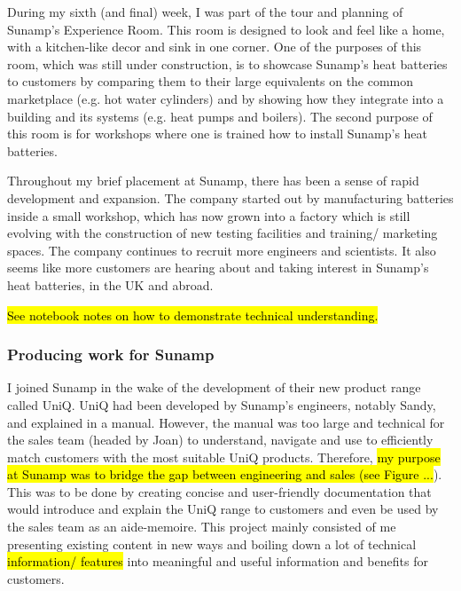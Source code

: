 During my sixth (and final) week, I was part of the tour and planning of Sunamp's Experience Room.
This room is designed to look and feel like a home, with a kitchen-like decor and sink in one corner.
One of the purposes of this room, which was still under construction, is to showcase Sunamp's heat batteries to customers by comparing them to their large equivalents on the common marketplace (e.g. hot water cylinders) and by showing how they integrate into a building and its systems (e.g. heat pumps
and boilers).
The second purpose of this room is for workshops where one is trained how to install Sunamp's heat batteries.

Throughout my brief placement at Sunamp, there has been a sense of rapid development and expansion.
The company started out by manufacturing batteries inside a small workshop, which has now grown into a factory which is still evolving with the construction of new testing facilities and training/ marketing spaces.
The company continues to recruit more engineers and scientists.
It also seems like more customers are hearing about and taking interest in Sunamp's heat batteries, in the UK and abroad.

\hl{See notebook notes on how to demonstrate technical understanding.}



\subsubsection{Producing work for Sunamp}


I joined Sunamp in the wake of the development of their new product range called UniQ.
UniQ had been developed by Sunamp's engineers, notably Sandy, and explained in a manual.
However, the manual was too large and technical for the sales team (headed by Joan) to understand, navigate and use to efficiently match customers with the most suitable UniQ products.
Therefore, \hl{my purpose at Sunamp was to bridge the gap between engineering and sales (see Figure ...}).
This was to be done by creating concise and user-friendly documentation that would introduce and explain the UniQ range to customers and even be used by the sales team as an aide-memoire.
This project mainly consisted of me presenting existing content in new ways and boiling down a lot of technical \hl{information/ features} into meaningful and useful information and benefits for customers.


